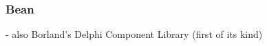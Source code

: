 %
%
%
%
%
%
%

\subsubsection{Bean}
\label{bean_heading}

- also Borland's Delphi Component Library (first of its kind)
